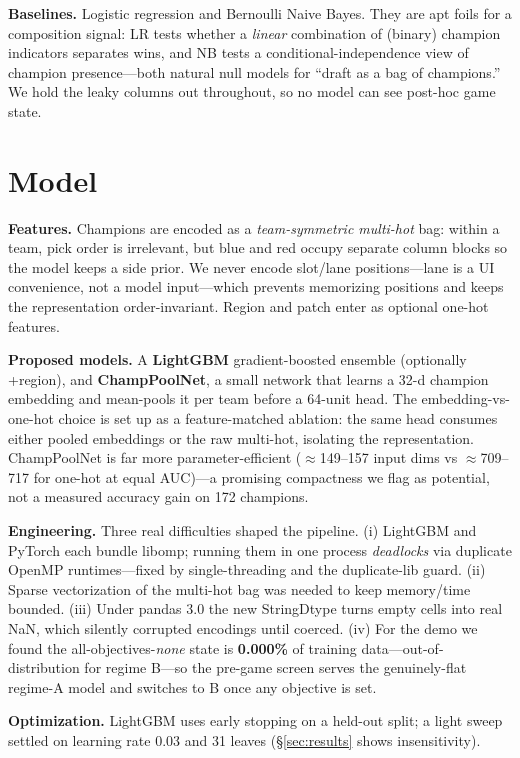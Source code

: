 \documentclass[sigconf,nonacm]{acmart}
\begin{document}
\textbf{Baselines.} Logistic regression and Bernoulli Naive Bayes. They are apt
foils for a composition signal: LR tests whether a \emph{linear} combination of
(binary) champion indicators separates wins, and NB tests a
conditional-independence view of champion presence---both natural null models for
``draft as a bag of champions.'' We hold the leaky columns out throughout, so no
model can see post-hoc game state.

\section{Model}
\textbf{Features.} Champions are encoded as a \emph{team-symmetric multi-hot} bag:
within a team, pick order is irrelevant, but blue and red occupy separate column
blocks so the model keeps a side prior. We never encode slot/lane positions---lane
is a UI convenience, not a model input---which prevents memorizing positions and
keeps the representation order-invariant. Region and patch enter as optional
one-hot features.

\textbf{Proposed models.} A \textbf{LightGBM} gradient-boosted ensemble
(optionally +region), and \textbf{ChampPoolNet}, a small network that learns a
32-d champion embedding and mean-pools it per team before a 64-unit head. The
embedding-vs-one-hot choice is set up as a feature-matched ablation: the same
head consumes either pooled embeddings or the raw multi-hot, isolating the
representation. ChampPoolNet is far more parameter-efficient ($\approx$149--157
input dims vs $\approx$709--717 for one-hot at equal AUC)---a promising
compactness we flag as potential, not a measured accuracy gain on 172 champions.

\textbf{Engineering.} Three real difficulties shaped the pipeline. (i) LightGBM
and PyTorch each bundle libomp; running them in one process \emph{deadlocks} via
duplicate OpenMP runtimes---fixed by single-threading and the duplicate-lib
guard. (ii) Sparse vectorization of the multi-hot bag was needed to keep
memory/time bounded. (iii) Under pandas 3.0 the new StringDtype turns empty cells
into real NaN, which silently corrupted encodings until coerced. (iv) For the
demo we found the all-objectives-\emph{none} state is \textbf{0.000\%} of training
data---out-of-distribution for regime B---so the pre-game screen serves the
genuinely-flat regime-A model and switches to B once any objective is set.

\textbf{Optimization.} LightGBM uses early stopping on a held-out split; a light
sweep settled on learning rate 0.03 and 31 leaves (\S\ref{sec:results} shows
insensitivity).
\end{document}
